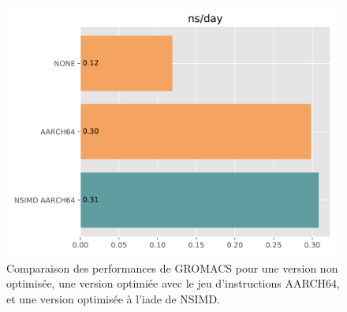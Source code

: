 \begin{figure}[!ht]
  \centering
  \includegraphics[width=.6\textwidth]{img/gromacs.pdf}
  \caption{Comparaison des performances de GROMACS pour une version non
    optimisée, une version optimiée avec le jeu d'instructions AARCH64, et une
    version optimisée à l'iade de NSIMD. }
  \label{fig:gromacs}
\end{figure}
